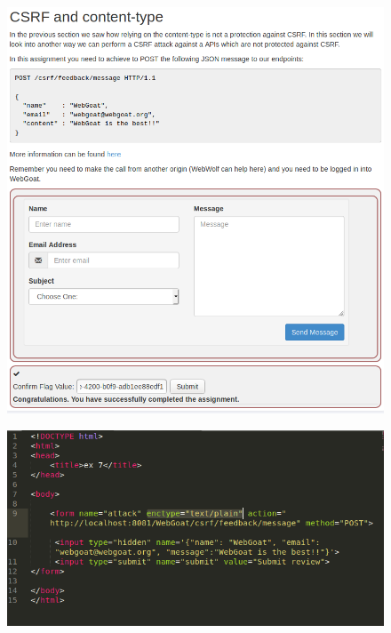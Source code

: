 \documentclass[11pt]{article}
\begin{document}
\begin{enumerate}
\begin{figure}
\centering
\includegraphics[scale=0.45]{result.png}
\end{figure}

\begin{figure}
\centering
\includegraphics[scale=0.55]{html.png}
\end{figure}
\end{enumerate}
\end{document}
